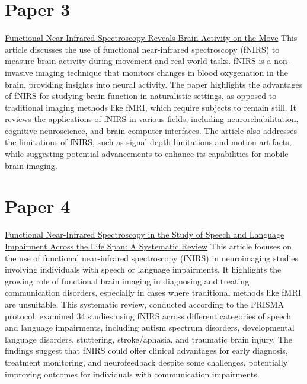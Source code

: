 \documentclass[12pt]{article}
\begin{document}
\section{Paper 3}
\href{https://www.ncbi.nlm.nih.gov/pmc/articles/PMC9231602/}{Functional Near-Infrared Spectroscopy Reveals Brain Activity on the Move}
This article discusses the use of functional near-infrared spectroscopy (fNIRS) to measure brain activity during movement and real-world tasks. fNIRS is a non-invasive imaging technique that monitors changes in blood oxygenation in the brain, providing insights into neural activity. The paper highlights the advantages of fNIRS for studying brain function in naturalistic settings, as opposed to traditional imaging methods like fMRI, which require subjects to remain still. It reviews the applications of fNIRS in various fields, including neurorehabilitation, cognitive neuroscience, and brain-computer interfaces. The article also addresses the limitations of fNIRS, such as signal depth limitations and motion artifacts, while suggesting potential advancements to enhance its capabilities for mobile brain imaging.

\section{Paper 4}
\href{https://pubs.asha.org/doi/10.1044/2020_AJSLP-19-00050}{Functional Near-Infrared Spectroscopy in the Study of Speech and Language Impairment Across the Life Span: A Systematic Review}
This article focuses on the use of functional near-infrared spectroscopy (fNIRS) in neuroimaging studies involving individuals with speech or language impairments. It highlights the growing role of functional brain imaging in diagnosing and treating communication disorders, especially in cases where traditional methods like fMRI are unsuitable. This systematic review, conducted according to the PRISMA protocol, examined 34 studies using fNIRS across different categories of speech and language impairments, including autism spectrum disorders, developmental language disorders, stuttering, stroke/aphasia, and traumatic brain injury. The findings suggest that fNIRS could offer clinical advantages for early diagnosis, treatment monitoring, and neurofeedback despite some challenges, potentially improving outcomes for individuals with communication impairments.
\end{document}
